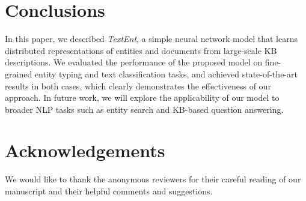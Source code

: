 \documentclass[11pt]{article}
\begin{document}
  \section{Conclusions}
  In this paper, we described \textit{TextEnt}, a simple neural network model that learns distributed representations of entities and documents from large-scale KB descriptions.
  We evaluated the performance of the proposed model on fine-grained entity typing and text classification tasks, and achieved state-of-the-art results in both cases, which clearly demonstrates the effectiveness of our approach.
  In future work, we will explore the applicability of our model to broader NLP tasks such as entity search and KB-based question answering.

  \section*{Acknowledgements}
  We would like to thank the anonymous reviewers for their careful reading of our manuscript and their helpful comments and suggestions.

  
  
\end{document}
